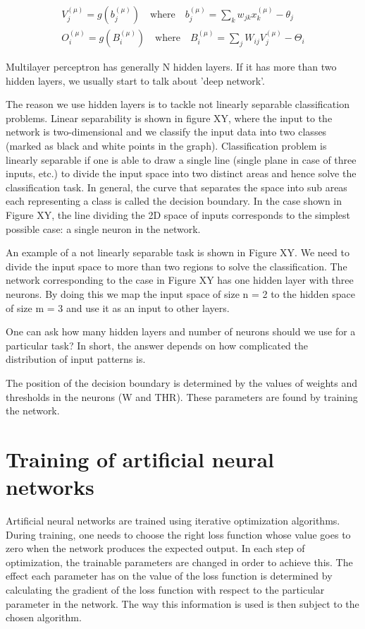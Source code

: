 \begin{gather}
V_j^{(\mu)} = g(b_j^{(\mu)}) \quad \text{where} \quad b_j^{(\mu)} = \sum_{k} w_{jk} x_{k}^{(\mu)} - \theta_{j} \\
O_i^{(\mu)} = g(B_i^{(\mu)}) \quad \text{where} \quad B_i^{(\mu)} = \sum_{j} W_{ij} V_{j}^{(\mu)} - \Theta_{i} 
\end{gather}

Multilayer perceptron has generally N hidden layers. If it has more than two hidden layers, we usually start to talk about 'deep network'. 

The reason we use hidden layers is to tackle not linearly separable classification problems. Linear separability is shown in figure XY, where the input to the network is two-dimensional and we classify the input data into two classes (marked as black and white points in the graph). Classification problem is linearly separable if one is able to draw a single line (single plane in case of three inputs, etc.) to divide the input space into two distinct areas and hence solve the classification task. In general, the curve that separates the space into sub areas each representing a class is called the decision boundary. In the case shown in Figure XY, the line dividing the 2D space of inputs corresponds to the simplest possible case: a single neuron in the network.

An example of a not linearly separable task is shown in Figure XY. We need to divide the input space to more than two regions to solve the classification. The network corresponding to the case in Figure XY has one hidden layer with three neurons. By doing this we map the input space of size n = 2 to the hidden space of size m = 3 and use it as an input to other layers.

One can ask how many hidden layers and number of neurons should we use for a particular task? In short, the answer depends on how complicated the distribution of input patterns is.

The position of the decision boundary is determined by the values of weights and thresholds in the neurons (W and THR). These parameters are found by training the network. 

\section{Training of artificial neural networks}

Artificial neural networks are trained using iterative optimization algorithms. During training, one needs to choose the right loss function whose value goes to zero when the network produces the expected output. In each step of optimization, the trainable parameters are changed in order to achieve this. The effect each parameter has on the value of the loss function is determined by calculating the gradient of the loss function with respect to the particular parameter in the network. The way this information is used is then subject to the chosen algorithm. 

